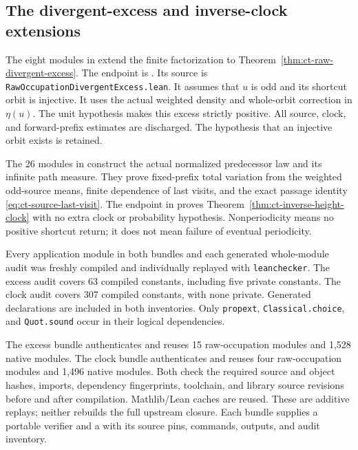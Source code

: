 \documentclass[11pt,a4paper]{article}
\begin{document}
\subsection{The divergent-excess and inverse-clock extensions}

The eight modules in  extend the
finite factorization to Theorem~\ref{thm:ct-raw-divergent-excess}.
The endpoint is .
Its source is \texttt{RawOccupationDivergentExcess.lean}.
It assumes that \(u\) is odd and its shortcut orbit is injective.
It uses the actual weighted density and whole-orbit correction in
\(\eta(u)\). The unit hypothesis makes this excess strictly positive.
All source, clock, and forward-prefix estimates are discharged.
The hypothesis that an injective orbit exists is retained.

The 26 modules in  construct the
actual normalized predecessor law and its infinite path measure.
They prove fixed-prefix total variation from the weighted odd-source
means, finite dependence of last visits, and the exact passage identity
\eqref{eq:ct-source-last-visit}. The endpoint
 in
 proves
Theorem~\ref{thm:ct-inverse-height-clock} with no extra clock or
probability hypothesis. Nonperiodicity means no positive shortcut
return; it does not mean failure of eventual periodicity.

Every application module in both bundles and each generated whole-module
audit was freshly compiled and individually replayed with
\texttt{leanchecker}. The excess audit covers 63 compiled constants,
including five private constants. The clock audit covers 307 compiled
constants, with none private. Generated declarations are included in
both inventories. Only \texttt{propext}, \texttt{Classical.choice},
and \texttt{Quot.sound} occur in their logical dependencies.

The excess bundle authenticates and reuses 15 raw-occupation modules
and 1,528 native modules. The clock bundle authenticates and reuses
four raw-occupation modules and 1,496 native modules. Both check the
required source and object hashes, imports, dependency fingerprints,
toolchain, and library source revisions before and after compilation.
Mathlib/Lean caches are reused. These are additive replays; neither
rebuilds the full upstream closure. Each bundle supplies a portable
verifier and a  with its source pins,
commands, outputs, and audit inventory.
\end{document}
